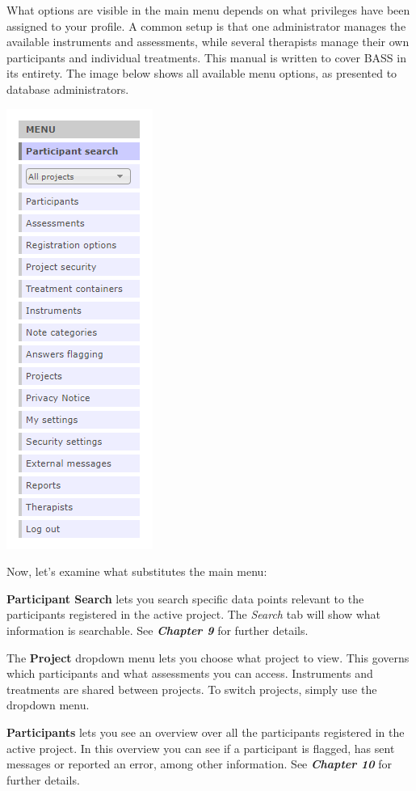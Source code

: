 \documentclass[
]{book}
\begin{document}
What options are visible in the main menu depends on what privileges have been assigned to your profile. A common setup is that one administrator manages the available instruments and assessments, while several therapists manage their own participants and individual treatments. This manual is written to cover BASS in its entirety. The image below shows all available menu options, as presented to database administrators.

\includegraphics{images/main-menu.png}

Now, let's examine what substitutes the main menu:

\textbf{Participant Search} lets you search specific data points relevant to the participants registered in the active project. The \emph{Search} tab will show what information is searchable. See \textbf{\emph{Chapter 9}} for further details.

The \textbf{Project} dropdown menu lets you choose what project to view. This governs which participants and what assessments you can access. Instruments and treatments are shared between projects. To switch projects, simply use the dropdown menu.

\textbf{Participants} lets you see an overview over all the participants registered in the active project. In this overview you can see if a participant is flagged, has sent messages or reported an error, among other information. See \textbf{\emph{Chapter 10}} for further details.
\end{document}
